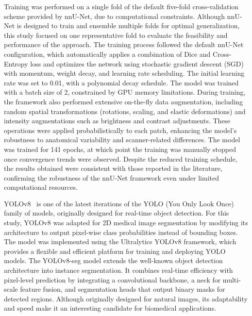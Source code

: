 \documentclass[12pt]{article}
\begin{document}
Training was performed on a single fold of the default five-fold cross-validation scheme provided by nnU-Net, due to computational constraints. Although nnU-Net is designed to train and ensemble multiple folds for optimal generalization, this study focused on one representative fold to evaluate the feasibility and performance of the approach.
%
The training process followed the default nnU-Net configuration, which automatically applies a combination of Dice and Cross-Entropy loss and optimizes the network using stochastic gradient descent (SGD) with momentum, weight decay, and learning rate scheduling. The initial learning rate was set to 0.01, with a polynomial decay schedule. The model was trained with a batch size of 2, constrained by GPU memory limitations.
%
During training, the framework also performed extensive on-the-fly data augmentation, including random spatial transformations (rotations, scaling, and elastic deformations) and intensity augmentations such as brightness and contrast adjustments. These operations were applied probabilistically to each patch, enhancing the model’s robustness to anatomical variability and scanner-related differences.
%
The model was trained for 141 epochs, at which point the training was manually stopped once convergence trends were observed. Despite the reduced training schedule, the results obtained were consistent with those reported in the literature, confirming the robustness of the nnU-Net framework even under limited computational resources.


YOLOv8~\cite{jocherUltralyticsYolov5V702022} is one of the latest iterations of the YOLO (You Only Look Once) family of models, originally designed for real-time object detection. For this study, YOLOv8 was adapted for 2D medical image segmentation by modifying its architecture to output pixel-wise class probabilities instead of bounding boxes. The model was implemented using the Ultralytics YOLOv8 framework, which provides a flexible and efficient platform for training and deploying YOLO models.
%
The YOLOv8-seg model extends the well-known object detection architecture into instance segmentation. It combines real-time efficiency with pixel-level prediction by integrating a convolutional backbone, a neck for multi-scale feature fusion, and segmentation heads that output binary masks for detected regions. Although originally designed for natural images, its adaptability and speed make it an interesting candidate for biomedical applications. 
\end{document}
